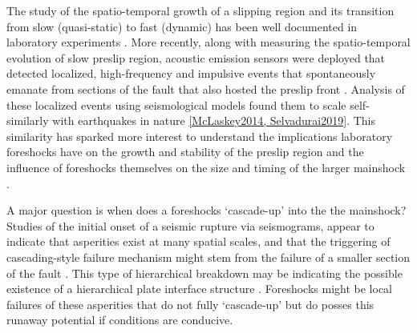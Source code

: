 \documentclass[preprint,1p, 10pt,authoryear]{elsarticle}
\begin{document}
The study of the spatio-temporal growth of a slipping region  and its transition from slow (quasi-static) to fast (dynamic) has been well documented in laboratory experiments \citep{Dieterich1978, Okubu1984, Yamashita1992, Ohnaka1999, Nielsen2010, Latour2013, Fukuyama2018, Zhuo2018, McLaskey2017, Ke2018, Buijze2020}. More recently, along with measuring the spatio-temporal evolution of slow preslip region, acoustic emission sensors were deployed that detected localized, high-frequency and impulsive events that spontaneously emanate from sections of the fault that also hosted the preslip front \citep{Shengli2002, McLaskey2013, Selvadurai2015}.  Analysis of these localized events using seismological models found them to scale self-similarly with earthquakes in nature \ref{McLaskey2014, Selvadurai2019}. This similarity has sparked more interest to understand the implications laboratory foreshocks have on the growth and stability of the preslip region and the influence of foreshocks themselves on the size and timing of the larger mainshock \citep{McLaskey2019}.  

A major question is when does a foreshocks `cascade-up' into the the mainshock? Studies of the initial onset of a seismic rupture via seismograms, appear to indicate that asperities exist at many spatial scales, and that the triggering of cascading-style failure mechanism might stem from the failure of a smaller section of the fault \citep{Okuda2018, Ide2019}. This type of hierarchical breakdown may be indicating the possible existence of a hierarchical plate interface structure \citep{Ide2005, Aochi2014, Aochi2017}.  Foreshocks might be local failures of these asperities that do not fully `cascade-up' but do posses this runaway potential if conditions are conducive. 
\end{document}
